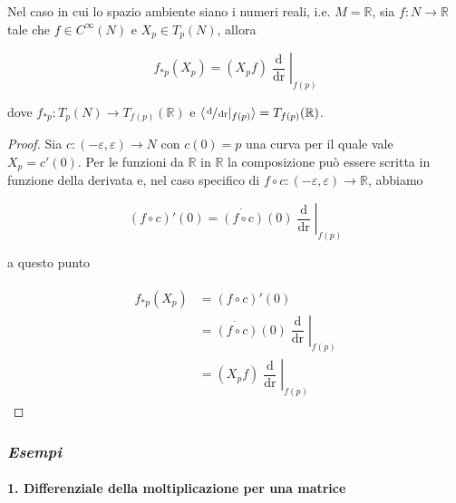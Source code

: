 \begin{corollary}
	Nel caso in cui lo spazio ambiente siano i numeri reali, i.e. $ M = \mathbb{R} $, sia $ f : N \to \mathbb{R} $ tale che $ f \in C^{\infty}(N) $ e $ X_{p} \in T_{p}(N) $, allora
	
	\begin{equation}
		f_{*p}(X_{p}) = (X_{p} f) \left. \dfrac{\operatorname{d}}{\operatorname{dr}} \right|_{f(p)}
	\end{equation}

	dove $ f_{*p} : T_{p}(N) \to T_{f(p)}(\mathbb{R}) $ e $ \langle \sfrac{\operatorname{d}}{\operatorname{dr}} |_{f(p)} \rangle = T_{f(p)}(\mathbb{R}) $.
\end{corollary}

\begin{proof}
	Sia $ c : (-\varepsilon,\varepsilon) \to N $ con $ c(0) = p $ una curva per il quale vale $ X_{p} = c'(0) $. Per le funzioni da $ \mathbb{R} $ in $ \mathbb{R} $ la composizione può essere scritta in funzione della derivata e, nel caso specifico di $ f \circ c : (-\varepsilon,\varepsilon) \to \mathbb{R} $, abbiamo
	
	\begin{equation}
		(f \circ c)'(0) = \dot{(f \circ c)}(0) \left. \dfrac{\operatorname{d}}{\operatorname{dr}} \right|_{f(p)}
	\end{equation}

	a questo punto
	
	\begin{align}
		\begin{split}
			f_{*p}(X_{p}) &= (f \circ c)' (0)\\
			&= \dot{(f \circ c)}(0) \left. \dfrac{\operatorname{d}}{\operatorname{dr}} \right|_{f(p)}\\
			&= (X_{p} f) \left. \dfrac{\operatorname{d}}{\operatorname{dr}} \right|_{f(p)}
		\end{split}
	\end{align}
\end{proof}

\subsubsection{\textit{Esempi}}

\paragraph{1. Differenziale della moltiplicazione per una matrice}

